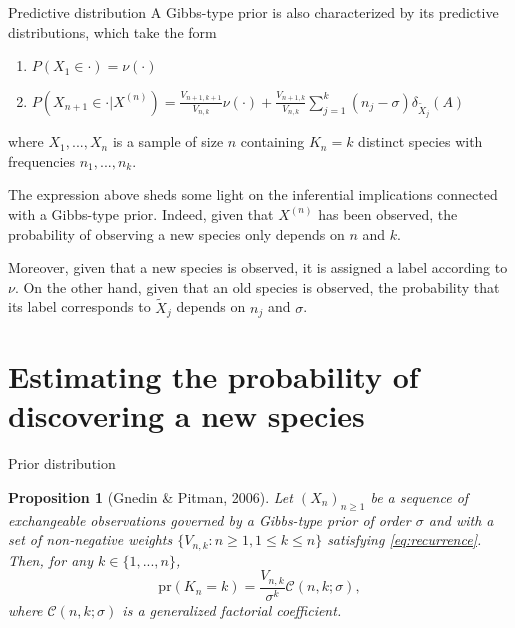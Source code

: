 \documentclass[11pt, handout]{beamer}
\newtheorem{proposition}{Proposition}
\begin{document}
\begin{frame}{Predictive distribution}
    A Gibbs-type prior is also characterized by its predictive distributions, which take the form
    \begin{enumerate}
        \item \(P(X_1 \in \cdot) = \nu(\cdot)\)
        \item \(P(X_{n + 1} \in \cdot | X^{(n)}) = \frac{V_{n+1,k+1}}{V_{n,k}} \nu(\cdot) + \frac{V_{n+1,k}}{V_{n, k}} \sum_{j = 1}^k (n_j - \sigma) \delta_{\tilde{X}_j}(A)\)
    \end{enumerate}
    where \(X_1,...,X_n\) is a sample of size \(n\) containing \(K_n = k\) distinct species with frequencies \(n_1,...,n_k\).
    \medskip

    The expression above sheds some light on the inferential implications connected with a Gibbs-type prior. Indeed, given that \(X^{(n)}\) has been observed, the probability of observing a new species only depends on \(n\) and \(k\). 
    \medskip
    
    Moreover, given that a new species is observed, it is assigned a label according to \(\nu\). On the other hand, given that an old species is observed, the probability that its label corresponds to \(\tilde{X}_j\) depends on \(n_j\) and \(\sigma\).
\end{frame}

\section{Estimating the probability of discovering a new species}

\begin{frame}{Prior distribution}
    \begin{proposition}[Gnedin \& Pitman, 2006]
         Let \((X_n)_{n \geq 1}\) be a sequence of exchangeable observations governed by a Gibbs-type prior of order \(\sigma\) and with a set of non-negative weights \(\{V_{n, k} \colon n \geq 1, 1 \leq k \leq n\}\) satisfying \eqref{eq:recurrence}. Then, for any \(k \in \{1,...,n\}\),
        \begin{equation*}
            \text{pr}(K_n = k) = \frac{V_{n,k}}{\sigma^k} \mathscr{C}(n, k; \sigma),
        \end{equation*}
        where \(\mathscr{C}(n, k; \sigma)\) is a generalized factorial coefficient. %
    \end{proposition}
\end{frame}
\end{document}
